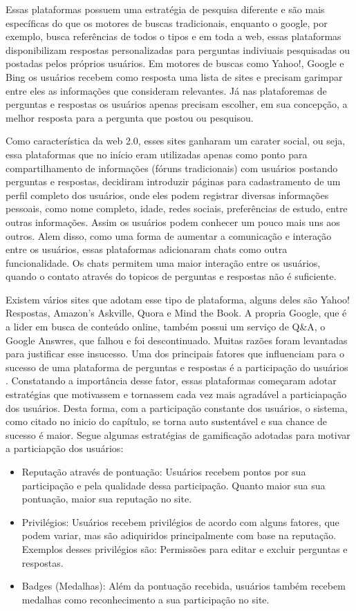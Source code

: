  Essas plataformas possuem uma estratégia de pesquisa diferente e são mais específicas do que os motores de buscas tradicionais, enquanto o google, por exemplo, busca referências de todos o
 tipos e em toda a web, essas plataformas disponibilizam respostas personalizadas para perguntas indiviuais pesquisadas ou postadas pelos próprios usuários. Em motores de buscas como Yahoo!,
 Google e Bing os usuários recebem como resposta uma lista de sites e precisam garimpar entre eles as informações que consideram relevantes. Já nas plataforemas de perguntas e respostas os usuários apenas precisam
 escolher, em sua concepção, a melhor resposta para a pergunta que postou ou pesquisou.

Como característica da web 2.0, esses sites ganharam um carater social, ou seja, essa plataformas que no início eram utilizadas apenas como ponto para compartilhamento de informações (fóruns tradicionais)
com usuários postando perguntas e respostas, decidiram  introduzir páginas para cadastramento de um perfil completo dos usuários, onde eles podem registrar diversas informações pessoais, como 
nome completo, idade, redes sociais, preferências de estudo, entre outras informações. Assim os usuários podem conhecer um pouco mais uns aos outros. Alem disso, como uma forma de aumentar a comunicação e interação
entre os usuários, essas plataformas adicionaram chats como outra funcionalidade. Os chats permitem uma maior interação entre os usuários, quando o contato através do topicos de perguntas e respostas não é suficiente.

Existem vários sites que adotam esse tipo de plataforma, alguns deles são Yahoo! Respostas, Amazon’s Askville, Quora e Mind the Book. A propria Google, que é a lider em busca de conteúdo online, também possui um serviço de Q\&A, 
o Google Answres, que falhou e foi descontinuado. Muitas razões foram levantadas para justificar esse insucesso. Uma dos principais fatores que influenciam para o sucesso de uma plataforma
 de perguntas e respostas é a participação do usuários \cite{shah2008explorin}. Constatando a importância desse fator, essas plataformas começaram adotar estratégias que motivassem e tornassem cada vez mais agradável a particiapação dos usuários. Desta forma, com a participação constante dos usuários, o sistema, como citado no inicio do capítulo, se torna auto sustentável e sua chance de sucesso é maior. Segue algumas estratégias de gamificação adotadas para  motivar a particiapção dos usuários:

\begin{itemize}
	\item Reputação através de pontuação: Usuários recebem pontos por sua participação e pela qualidade dessa participação. Quanto maior sua sua pontuação, maior sua reputação no site. 
	\item Privilégios: Usuários recebem privilégios de acordo com alguns fatores, que podem variar, mas são adiquiridos principalmente com base na reputação. Exemplos desses privilégios são: Permissões para editar e excluir perguntas e respostas.
	\item Badges (Medalhas): Além da pontuação recebida, usuários também recebem medalhas como reconhecimento a sua participação no site.  
\end{itemize}

